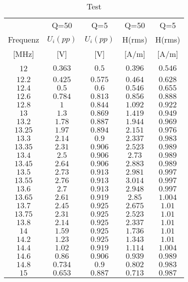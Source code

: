 \documentclass[12pt,a4paper,ngerman]{article}
\begin{document}
\begin{table}[H]
\begin{center}
\begin{tabular}{ |c|c|c|c|c| }
  \hline
     & Q=50 & Q=5 & Q=50 & Q=5\\

    Frequenz & $U_i(pp)$ & $U_i(pp)$ & H(rms) & H(rms)\\

  [MHz] & [V] & [V] & [A/m] & [A/m] \\
  \hline
  12 & $0.363$ & $0.5$ & $0.396$ & $0.546$ \\
  \hline
  $12.2$ & $0.425$ & $0.575$ & $0.464$ & $0.628$ \\
  \hline
  $12.4$ & $0.5$ & $0.6$ & $0.546$ & $0.655$ \\
  \hline
  $12.6$ & $0.784$ & $0.813$ & $0.856$ & $0.888$ \\
    \hline
  $12.8$ & $1$ & $0.844$ & $1.092$ & $0.922$ \\
    \hline
  $13$ & $1.3$ & $0.869$ & $1.419$ & $0.949$ \\
    \hline
  $13.2$ & $1.78$ & $0.887$ & $1.944$ & $0.969$ \\
     \hline
  $13.25$ & $1.97$ & $0.894$ & $2.151$ & $0.976$ \\ 
    \hline
  $13.3$ & $2.14$ & $0.9$ & $2.337$ & $0.983$ \\
    \hline
  $13.35$ & $2.31$ & $0.906$ & $2.523$ & $0.989$ \\
    \hline
  $13.4$ & $2.5$ & $0.906$ & $2.73$ & $0.989$ \\
    \hline
  $13.45$ & $2.64$ & $0.906$ & $2.883$ & $0.989$ \\
    \hline
  $13.5$ & $2.73$ & $0.913$ & $2.981$ & $0.997$ \\
     \hline
  $13.55$ & $2.76$ & $0.913$ & $3.014$ & $0.997$ \\
      \hline
  $13.6$ & $2.7$ & $0.913$ & $2.948$ & $0.997$ \\ 
      \hline
  $13.65$ & $2.61$ & $0.919$ & $2.85$ & $1.004$ \\
      \hline
  $13.7$ & $2.45$ & $0.925$ & $2.675$ & $1.01$ \\
      \hline
  $13.75$ & $2.31$ & $0.925$ & $2.523$ & $1.01$ \\
      \hline
  $13.8$ & $2.14$ & $0.925$ & $2.337$ & $1.01$ \\
      \hline
  $14$ & $1.59$ & $0.925$ & $1.736$ & $1.01$ \\
      \hline
  $14.2$ & $1.23$ & $0.925$ & $1.343$ & $1.01$ \\
      \hline
  $14.4$ & $1.02$ & $0.919$ & $1.114$ & $1.004$ \\
      \hline
  $14.6$ & $0.86$ & $0.906$ & $0.939$ & $0.989$ \\
      \hline
  $14.8$ & $0.734$ & $0.9$ & $0.802$ & $0.983$ \\
      \hline
  $15$ & $0.653$ & $0.887$ & $0.713$ & $0.987$ \\
      \hline
\end{tabular}
\caption{Test}
\end{center}
\end{table}
\end{document}
